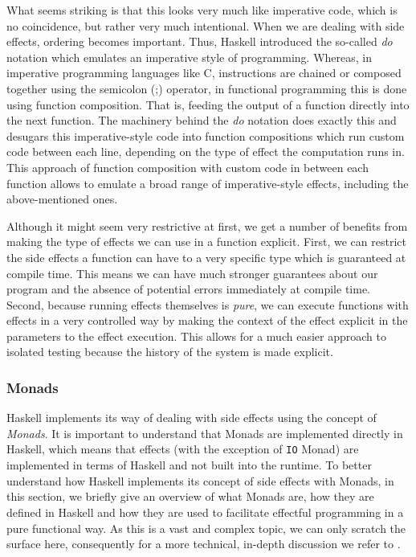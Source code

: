 What seems striking is that this looks very much like imperative code, which is no coincidence, but rather very much intentional. When we are dealing with side effects, ordering becomes important. Thus, Haskell introduced the so-called \textit{do} notation which emulates an imperative style of programming. Whereas, in imperative programming languages like C, instructions are chained or composed together using the semicolon (;) operator, in functional programming this is done using function composition. That is, feeding the output of a function directly into the next function. The machinery behind the \textit{do} notation does exactly this and desugars this imperative-style code into function compositions which run custom code between each line, depending on the type of effect the computation runs in. This approach of function composition with custom code in between each function allows to emulate a broad range of imperative-style effects, including the above-mentioned ones.

Although it might seem very restrictive at first, we get a number of benefits from making the type of effects we can use in a function explicit. First, we can restrict the side effects a function can have to a very specific type which is guaranteed at compile time. This means we can have much stronger guarantees about our program and the absence of potential errors immediately at compile time. Second, because running effects themselves is \textit{pure}, we can execute functions with effects in a very controlled way by making the context of the effect explicit in the parameters to the effect execution. This allows for a much easier approach to isolated testing because the history of the system is made explicit. 

\subsubsection{Monads}
Haskell implements its way of dealing with side effects using the concept of \textit{Monads}. It is important to understand that Monads are implemented directly in Haskell, which means that effects (with the exception of \texttt{IO} Monad) are implemented in terms of Haskell and not built into the runtime. To better understand how Haskell implements its concept of side effects with Monads, in this section, we briefly give an overview of what Monads are, how they are defined in Haskell and how they are used to facilitate effectful programming in a pure functional way. As this is a vast and complex topic, we can only scratch the surface here, consequently for a more technical, in-depth discussion we refer to \cite{jones_tackling_2002,moggi_computational_1989,wadler_essence_1992,wadler_monads_1995,wadler_how_1997}.

